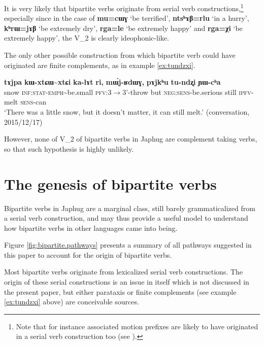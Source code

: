 \documentclass[oneside,a4paper,11pt]{article}
\newcommand{\ipa}[1]{{\phon\textbf{#1}}}
\newcommand{\jpg}[2]{\ipa{#1} `#2'}
\newcommand{\tld}{\textasciitilde{}}
\begin{document}
It is very likely that bipartite verbs originate from serial verb constructions,\footnote{Note that for instance associated motion prefixes are likely to have originated in a serial verb construction too (see \citealt{jacques13harmonization}).} especially since in the case of \jpg{mu=cɯɣ}{be  terrified}, \jpg{ntsʰɤβ=rlu}{in a hurry}, \jpg{kʰrɯ=jɤβ}{be extremely dry}, \jpg{rga=le}{be extremely happy} and \jpg{rga=χi}{be extremely happy}, the V_2 is clearly ideophonic-like. 

The only other possible construction from which bipartite verb could have originated are finite complements, as in example \ref{ex:tundzxi}.

\begin{exe}
\ex \label{ex:tundzxi}
\gll 
\ipa{tɤjpa} 	\ipa{kɯ-xtɕɯ\tld{}xtɕi} 	\ipa{ka-lɤt} 	\ipa{ri,} 	\ipa{mɯ́j-ʁdɯɣ,} 	\ipa{pɤjkʰu} 	\ipa{tu-ndʐi} 	\ipa{ɲɯ-cʰa} \\
snow \textsc{inf:stat-emph}\tld{}be.small \textsc{pfv}:3$\rightarrow$3'-throw but \textsc{neg:sens}-be.serious still \textsc{ipfv}-melt \textsc{sens}-can \\
\glt `There was a little snow, but it doesn't matter, it can still melt.' (conversation, 2015/12/17)
\end{exe}

However, none of V_2 of bipartite verbs in Japhug are complement taking verbs, so that such hypothesis is highly unlikely. 

\section{The genesis of bipartite verbs}
Bipartite verbs in Japhug are a marginal class, still barely grammaticalized from a serial verb construction, and may thus provide a useful model to understand how bipartite verbs in other languages came into being. 

Figure \ref{fig:bipartite.pathways} presents a summary of all pathways suggested in this paper to account for the origin of bipartite verbs.

Most bipartite verbs originate from lexicalized serial verb constructions. The origin of these serial constructions is an issue in itself which is not discussed in the present paper, but either parataxis or finite complements (see example \ref{ex:tundzxi} above) are conceivable sources.
\end{document}
